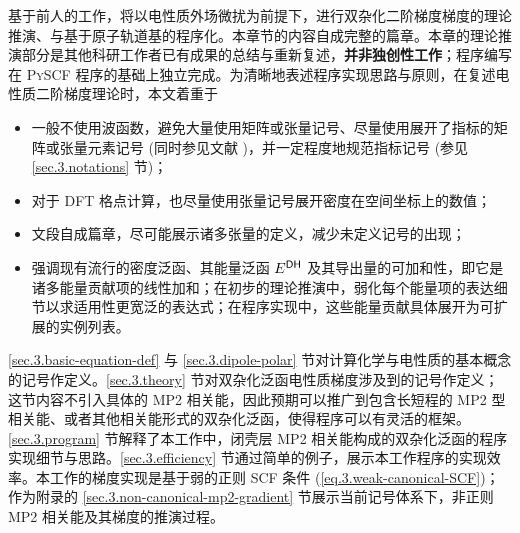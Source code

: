 基于前人的工作\cite{Gerratt-Mills.JCP.1968, Gerratt-Mills.JCP.1968a, Pople-Binkley.IJQC.1979, Dykstra-Jasien.CPL.1984, Handy-Schaefer.JCP.1984, Handy-Simandiras.CPL.1985, Pulay-Saeboe.TCA.1986, Trucks-Bartlett.CPL.1988, Frisch-Pople.CP.1990, Frisch-Pople.CPL.1990, Frisch-Pople.CPL.1990a, Gauss-Bartlett.JCP.1992, Stanton-Bartlett.CPL.1992, Johnson-Frisch.CPL.1993, Head-Gordon-Head-Gordon.CPL.1994, Yamaguchi-Schaefer.Oxford.1994, Weigend-Haeser.TCA.1997, Aikens-Gordon.TCA.2003, Cammi-Frisch.TCA.2004, Distasio-Head-Gordon.JCC.2007, Neese-Grimme.JCP.2007, Biczysko-Barone.JCTC.2010, Su-Xu.JCC.2013, Ji-Jung.JCTC.2013, Bykov-Neese.MP.2015, Stoychev-Neese.JCTC.2018, Gu-Xu.JCTC.2021, Yan-Xu.JCTC.2022}，将以电性质外场微扰为前提下，进行双杂化二阶梯度梯度的理论推演、与基于原子轨道基的程序化。本章节的内容自成完整的篇章。本章的理论推演部分是其他科研工作者已有成果的总结与重新复述，\textbf{并非独创性工作}；程序编写在 \textsc{PySCF} 程序的基础上独立完成。为清晰地表述程序实现思路与原则，在复述电性质二阶梯度理论时，本文着重于
\begin{itemize}[nosep]
    \item 一般不使用波函数，避免大量使用矩阵或张量记号、尽量使用展开了指标的矩阵或张量元素记号 (同时参见文献 )，并一定程度地规范指标记号 (参见 \ref{sec.3.notations} 节)；
    \item 对于 DFT 格点计算，也尽量使用张量记号展开密度在空间坐标上的数值；
    \item 文段自成篇章，尽可能展示诸多张量的定义，减少未定义记号的出现；
    \item 强调现有流行的密度泛函、其能量泛函 $E^{\textsf{DH}}$ 及其导出量的可加和性，即它是诸多能量贡献项的线性加和；在初步的理论推演中，弱化每个能量项的表达细节以求适用性更宽泛的表达式；在程序实现中，这些能量贡献具体展开为可扩展的实例列表。
\end{itemize}
\ref{sec.3.basic-equation-def} 与 \ref{sec.3.dipole-polar} 节对计算化学与电性质的基本概念的记号作定义。\ref{sec.3.theory} 节对双杂化泛函电性质梯度涉及到的记号作定义；这节内容不引入具体的 MP2 相关能，因此预期可以推广到包含长短程的 MP2 型相关能、或者其他相关能形式的双杂化泛函，使得程序可以有灵活的框架。\ref{sec.3.program} 节解释了本工作中，闭壳层 MP2 相关能构成的双杂化泛函的程序实现细节与思路。\ref{sec.3.efficiency} 节通过简单的例子，展示本工作程序的实现效率。本工作的梯度实现是基于弱的正则 SCF 条件 (\ref{eq.3.weak-canonical-SCF})；作为附录的 \ref{sec.3.non-canonical-mp2-gradient} 节展示当前记号体系下，非正则 MP2 相关能及其梯度的推演过程。


